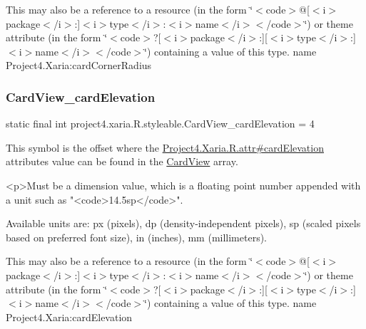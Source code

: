 This may also be a reference to a resource (in the form \char`\"{}$<$code$>$@\mbox{[}$<$i$>$package$<$/i$>$\+:\mbox{]}$<$i$>$type$<$/i$>$\+:$<$i$>$name$<$/i$>$$<$/code$>$\char`\"{}) or theme attribute (in the form \char`\"{}$<$code$>$?\mbox{[}$<$i$>$package$<$/i$>$\+:\mbox{]}\mbox{[}$<$i$>$type$<$/i$>$\+:\mbox{]}$<$i$>$name$<$/i$>$$<$/code$>$\char`\"{}) containing a value of this type.  name Project4.\+Xaria\+:card\+Corner\+Radius \mbox{\label{classproject4_1_1xaria_1_1R_1_1styleable_a54bee07e94f96a7a6825da65d58be17f}} 
\subsubsection{\texorpdfstring{Card\+View\+\_\+card\+Elevation}{CardView\_cardElevation}}
{\footnotesize\ttfamily static final int project4.\+xaria.\+R.\+styleable.\+Card\+View\+\_\+card\+Elevation = 4\hspace{0.3cm}{\ttfamily [static]}}

This symbol is the offset where the \hyperlink{}{Project4.\+Xaria.\+R.\+attr\#card\+Elevation} attribute\textquotesingle{}s value can be found in the \hyperlink{classproject4_1_1xaria_1_1R_1_1styleable_abef2e3d3e2b11dd786470094dbc57ea4}{Card\+View} array.

\begin{DoxyVerb}      <p>Must be a dimension value, which is a floating point number appended with a unit such as "<code>14.5sp</code>".
\end{DoxyVerb}
 Available units are\+: px (pixels), dp (density-\/independent pixels), sp (scaled pixels based on preferred font size), in (inches), mm (millimeters). 

This may also be a reference to a resource (in the form \char`\"{}$<$code$>$@\mbox{[}$<$i$>$package$<$/i$>$\+:\mbox{]}$<$i$>$type$<$/i$>$\+:$<$i$>$name$<$/i$>$$<$/code$>$\char`\"{}) or theme attribute (in the form \char`\"{}$<$code$>$?\mbox{[}$<$i$>$package$<$/i$>$\+:\mbox{]}\mbox{[}$<$i$>$type$<$/i$>$\+:\mbox{]}$<$i$>$name$<$/i$>$$<$/code$>$\char`\"{}) containing a value of this type.  name Project4.\+Xaria\+:card\+Elevation \mbox{\label{classproject4_1_1xaria_1_1R_1_1styleable_a4be9ec95637f04c772f94899092a55f8}} 
